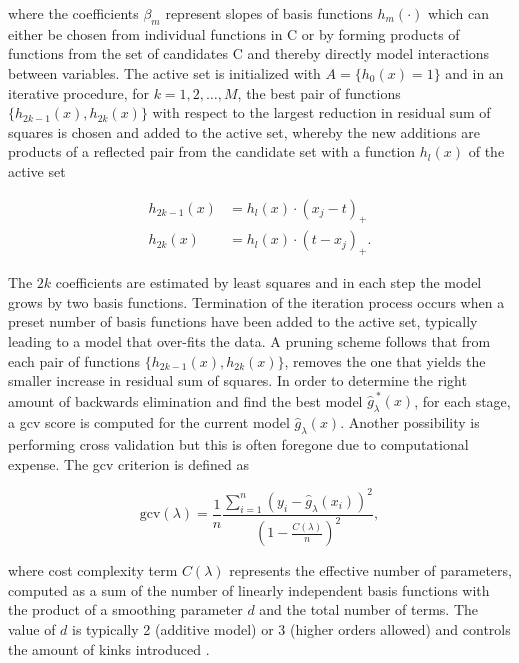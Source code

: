 where the coefficients $\beta_m$ represent slopes of basis functions $h_m(\cdot)$ which can either be chosen from individual functions in C or by forming products of functions from the set of candidates C and thereby directly model interactions between variables. The active set is initialized with $A=\{h_0(x)=1\}$ and in an iterative procedure, for $k=1, 2, \dotsc, M$, the best pair of functions $\{h_{2k-1}(x), h_{2k}(x)\}$ with respect to the largest reduction in residual sum of squares is chosen and added to the active set, whereby the new additions are products of a reflected pair from the candidate set with a function $h_l(x)$ of the active set

\begin{subequations}
\begin{align}
  h_{2k-1}(x) &= h_l(x) \cdot (x_j-t)_+ \\
  h_{2k}(x) &= h_l(x) \cdot (t-x_j)_+.
\end{align}
\end{subequations}

The $2k$ coefficients are estimated by least squares and in each step the model grows by two basis functions. Termination of the iteration process occurs when a preset number of basis functions have been added to the active set, typically leading to a model that over-fits the data. A pruning scheme follows that from each pair of functions $\{h_{2k-1}(x), h_{2k}(x)\}$, removes the one that yields the smaller increase in residual sum of squares. In order to determine the right amount of backwards elimination and find the best model $\widehat{g}_\lambda^{\ *}(x)$, for each stage, a \gls{gcv} score is computed for the current model $\widehat{g}_\lambda(x)$. Another possibility is performing cross validation but this is often foregone due to computational expense. The \gls{gcv} criterion is defined as

\begin{equation}
  \text{gcv}(\lambda) = \frac{1}{n}\frac{\sum_{i=1}^n \left(y_i-\widehat{g}_\lambda(x_i)\right)^2}{\left(1-\frac{C(\lambda)}{n}\right)^2},
\end{equation}

where cost complexity term $C(\lambda)$ represents the effective number of parameters, computed as a sum of the number of linearly independent basis functions with the product of a smoothing parameter $d$ and the total number of terms. The value of $d$ is typically 2 (additive model) or 3 (higher orders allowed) and controls the amount of kinks introduced \citep{Friedman1991}.

